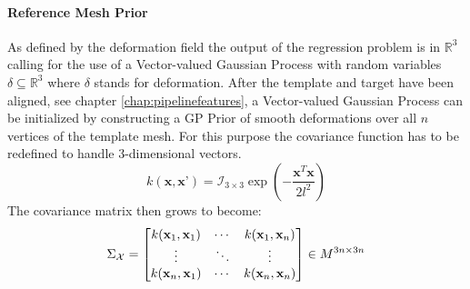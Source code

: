\paragraph{Reference Mesh Prior}
As defined by the deformation field the output of the regression problem is in $\mathbb{R}^3$ calling for the use of a Vector-valued Gaussian Process with random variables $\delta \subseteq \mathbb{R}^3$ where $\delta$ stands for deformation. 
After the template and target have been aligned, see chapter \ref{chap:pipelinefeatures}, a Vector-valued Gaussian Process can be initialized by constructing a GP Prior of smooth deformations over all $n$ vertices of the template mesh. For this purpose the covariance function has to be redefined to handle 3-dimensional vectors.
\begin{equation}
    k\left(\textbf{x}, \textbf{x'}\right) = \mathcal{I}_{3 \times 3}\exp\left(-\frac{\textbf{x}^T\textbf{x}}{2l^{2}}\right)
\end{equation}
The covariance matrix then grows to become: 
\begin{equation}
    \Sigma_{\mathcal{X}} = 
\begin{bmatrix}
    k(\textbf{x}_{1},\textbf{x}_{1}) & \cdots & k(\textbf{x}_{1},\textbf{x}_{n}) \\
\vdots & \ddots & \vdots \\
k(\textbf{x}_{n},\textbf{x}_{1}) & \cdots & k(\textbf{x}_{n},\textbf{x}_{n})
\end{bmatrix} \in M^{3n \times 3n}
\end{equation}

